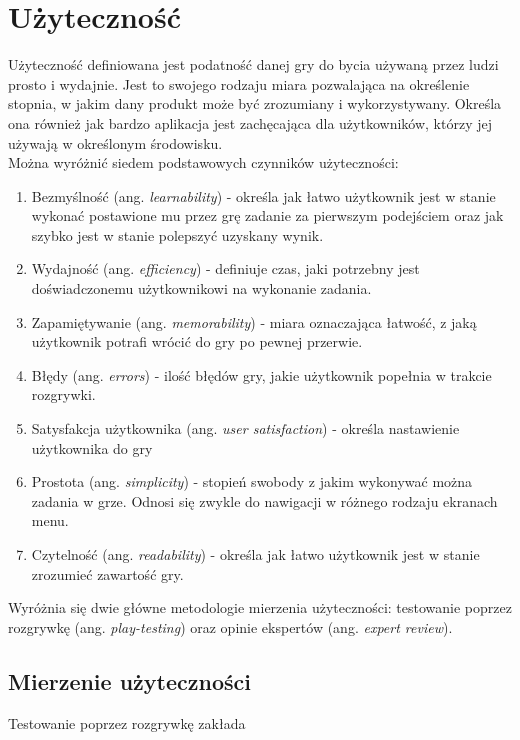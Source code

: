 \documentclass[a4paper,12pt,numbers=noenddot]{report}
\begin{document}
\section{Użyteczność}
Użyteczność definiowana jest podatność danej gry do bycia używaną przez ludzi prosto i wydajnie.\cite{art_Usability} Jest to swojego rodzaju miara pozwalająca na określenie stopnia, w jakim dany produkt może być zrozumiany i wykorzystywany. Określa ona również jak bardzo aplikacja jest zachęcająca dla użytkowników, którzy jej używają w określonym środowisku. \cite{art_evaluationOfMGevaluationSystem} 
\\
Można wyróżnić siedem podstawowych czynników użyteczności: \cite{art_UsabilityEvaluationSystematicReview}
\begin{enumerate}
\item Bezmyślność (ang. \textit{learnability}) - określa jak łatwo użytkownik jest w stanie wykonać postawione mu przez grę zadanie za pierwszym podejściem oraz jak szybko jest w stanie polepszyć uzyskany wynik.
\item Wydajność (ang. \textit{efficiency}) - definiuje czas, jaki potrzebny jest doświadczonemu użytkownikowi na wykonanie zadania.
\item Zapamiętywanie (ang. \textit{memorability}) - miara oznaczająca łatwość, z jaką użytkownik potrafi wrócić do gry po pewnej przerwie.
\item Błędy (ang. \textit{errors}) - ilość błędów gry, jakie użytkownik popełnia w trakcie rozgrywki.
\item Satysfakcja użytkownika (ang. \textit{user satisfaction}) - określa nastawienie użytkownika do gry
\item Prostota (ang. \textit{simplicity}) - stopień swobody z jakim wykonywać można zadania w grze. Odnosi się zwykle do nawigacji w różnego rodzaju ekranach menu.
\item Czytelność (ang. \textit{readability}) - określa jak łatwo użytkownik jest w stanie zrozumieć zawartość gry.
\end{enumerate}

Wyróżnia się dwie główne metodologie mierzenia użyteczności: testowanie poprzez rozgrywkę (ang. \textit{play-testing}) oraz opinie ekspertów (ang. \textit{expert review}).

\subsection{Mierzenie użyteczności}
Testowanie poprzez rozgrywkę zakłada \\
\end{document}
